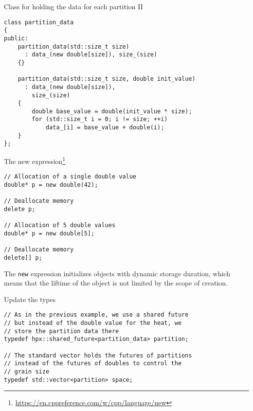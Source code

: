 \documentclass[12pt,t]{beamer}
\begin{document}
\begin{frame}[fragile]{Class for holding the data for each partition II}

\begin{lstlisting}
class partition_data
{
public:
    partition_data(std::size_t size)
      : data_(new double[size]), size_(size)
    {}

    partition_data(std::size_t size, double init_value)
      : data_(new double[size]),
        size_(size)
    {
        double base_value = double(init_value * size);
        for (std::size_t i = 0; i != size; ++i)
            data_[i] = base_value + double(i);
    }
};
\end{lstlisting}

\end{frame}

\begin{frame}[fragile]{The new expression\footnote{\tiny\url{https://en.cppreference.com/w/cpp/language/new}}}

\begin{lstlisting}
// Allocation of a single double value 
double* p = new double(42);

// Deallocate memory
delete p;

// Allocation of 5 double values
double* p = new double[5];

// Deallocate memory
delete[] p;

\end{lstlisting}

The \lstinline|new| expression initializes objects with dynamic storage duration, which means that the liftime of the object is not limited by the scope of creation.
\end{frame}


\begin{frame}[fragile]{Update the types}

\begin{lstlisting}
// As in the previous example, we use a shared future
// but instead of the double value for the heat, we
// store the partition data there
typedef hpx::shared_future<partition_data> partition;

// The standard vector holds the futures of partitions
// instead of the futures of doubles to control the
// grain size
typedef std::vector<partition> space;
\end{lstlisting}


\end{frame}

\end{document}
